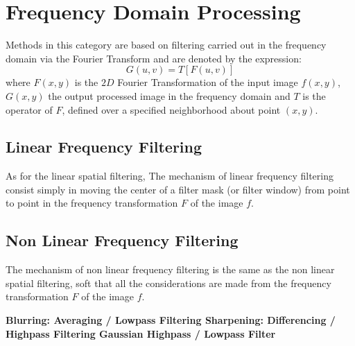 \section{Frequency Domain Processing}

Methods in this category are based on filtering carried out in the frequency domain via the Fourier Transform and are denoted by the expression:
\begin{equation}
	G(u,v) = T[F(u,v)]
\end{equation}
where $F(x,y)$ is the $2D$ Fourier Transformation of the input image $f(x,y)$, $G(x,y)$ the output processed image in the frequency domain and $T$ is the operator of $F$, defined over a specified neighborhood about point $(x,y)$.

\subsection{Linear Frequency Filtering}

As for the linear spatial filtering, The mechanism of linear frequency filtering consist simply in moving the center of a filter mask (or filter window) from point to point in the frequency transformation $F$ of the image $f$.

\subsection{Non Linear Frequency Filtering}

The mechanism of non linear frequency filtering is the same as the non linear spatial filtering, soft that all the considerations are made from the frequency transformation $F$ of the image $f$.

{\bf Blurring: Averaging / Lowpass Filtering 
Sharpening: Differencing / Highpass Filtering 
Gaussian Highpass / Lowpass Filter}


